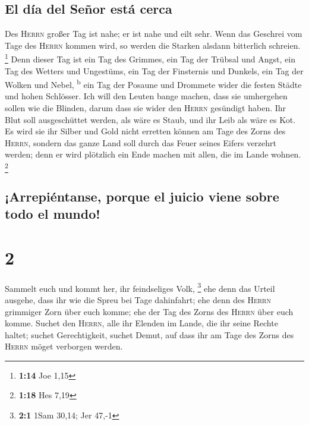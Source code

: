 \hypertarget{el-duxeda-del-seuxf1or-estuxe1-cerca}{%
\subsection{El día del Señor está
cerca}\label{el-duxeda-del-seuxf1or-estuxe1-cerca}}

 Des \textsc{Herrn} großer Tag ist nahe; er ist nahe und
eilt sehr. Wenn das Geschrei vom Tage des \textsc{Herrn} kommen wird, so
werden die Starken alsdann bitterlich schreien. \footnote{\textbf{1:14}
  Joe 1,15}  Denn dieser Tag ist ein Tag des Grimmes, ein
Tag der Trübsal und Angst, ein Tag des Wetters und Ungestüms, ein Tag
der Finsternis und Dunkels, ein Tag der Wolken und Nebel,
\textsuperscript{b}  ein Tag der Posaune und Drommete
wider die festen Städte und hohen Schlösser.  Ich will
den Leuten bange machen, dass sie umhergehen sollen wie die Blinden,
darum dass sie wider den \textsc{Herrn} gesündigt haben. Ihr Blut soll
ausgeschüttet werden, als wäre es Staub, und ihr Leib als wäre es Kot.
 Es wird sie ihr Silber und Gold nicht erretten können am
Tage des Zorns des \textsc{Herrn}, sondern das ganze Land soll durch das
Feuer seines Eifers verzehrt werden; denn er wird plötzlich ein Ende
machen mit allen, die im Lande wohnen. \footnote{\textbf{1:18} Hes 7,19}

\hypertarget{arrepiuxe9ntanse-porque-el-juicio-viene-sobre-todo-el-mundo}{%
\subsection{¡Arrepiéntanse, porque el juicio viene sobre todo el
mundo!}\label{arrepiuxe9ntanse-porque-el-juicio-viene-sobre-todo-el-mundo}}

\hypertarget{section-1}{%
\section{2}\label{section-1}}

 Sammelt euch und kommt her, ihr feindseliges Volk,
\footnote{\textbf{2:1} 1Sam 30,14; Jer 47,-1}  ehe denn
das Urteil ausgehe, dass ihr wie die Spreu bei Tage dahinfahrt; ehe denn
des \textsc{Herrn} grimmiger Zorn über euch komme; ehe der Tag des Zorns
des \textsc{Herrn} über euch komme.  Suchet den
\textsc{Herrn}, alle ihr Elenden im Lande, die ihr seine Rechte haltet;
suchet Gerechtigkeit, suchet Demut, auf dass ihr am Tage des Zorns des
\textsc{Herrn} möget verborgen werden.

